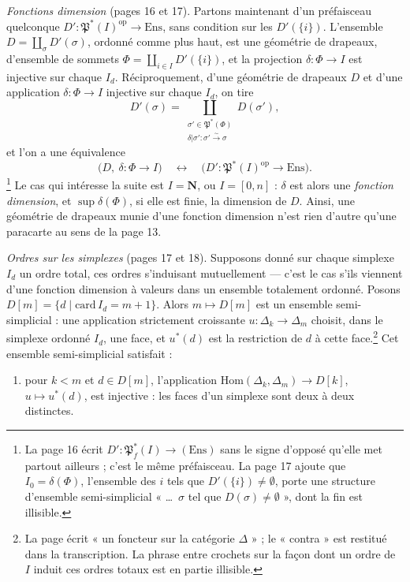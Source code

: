 \documentclass[11pt,a4paper]{article}
\begin{document}
\emph{Fonctions dimension} (pages 16 et 17). Partons maintenant d'un
préfaisceau quelconque $D' : \mathfrak{P}^*(I)^{\mathrm{op}} \to
\mathrm{Ens}$, sans condition sur les $D'(\{i\})$. L'ensemble $D =
\coprod_\sigma D'(\sigma)$, ordonné comme plus haut, est une géométrie de
drapeaux, d'ensemble de sommets $\Phi = \coprod_{i \in I} D'(\{i\})$, et la
projection $\delta : \Phi \to I$ est injective sur chaque $I_d$.
Réciproquement, d'une géométrie de drapeaux $D$ et d'une application
$\delta : \Phi \to I$ injective sur chaque $I_d$, on tire
\[
  D'(\sigma) = \coprod_{\substack{\sigma' \in \mathfrak{P}^*(\Phi) \\
  \delta|\sigma' : \sigma' \xrightarrow{\sim} \sigma}} D(\sigma') ,
\]
et l'on a une équivalence
\[
  \bigl(D, \ \delta : \Phi \to I\bigr) \quad \longleftrightarrow \quad
  \bigl(D' : \mathfrak{P}^*(I)^{\mathrm{op}} \to \mathrm{Ens}\bigr) .
\]
\footnote{La page 16 écrit $D' : \mathfrak{P}_f^*(I) \to (\mathrm{Ens})$ sans le
signe d'opposé qu'elle met partout ailleurs ; c'est le même préfaisceau. La
page 17 ajoute que $I_0 = \delta(\Phi)$, l'ensemble des $i$ tels que
$D'(\{i\}) \neq \emptyset$, porte une structure d'ensemble semi-simplicial
« \ldots\ $\sigma$ tel que $D(\sigma) \neq \emptyset$ », dont la fin est
illisible.} Le cas qui intéresse la suite est $I = \mathbf{N}$, ou $I = [0,
n]$ : $\delta$ est alors une \emph{fonction dimension}, et $\sup \delta(\Phi)$,
si elle est finie, la dimension de $D$. Ainsi, une géométrie de drapeaux munie
d'une fonction dimension n'est rien d'autre qu'une paracarte au sens de la
page 13.

\emph{Ordres sur les simplexes} (pages 17 et 18). Supposons donné sur chaque
simplexe $I_d$ un ordre total, ces ordres s'induisant mutuellement --- c'est
le cas s'ils viennent d'une fonction dimension à valeurs dans un ensemble
totalement ordonné. Posons $D[m] = \{d \mid \mathrm{card}\, I_d = m + 1\}$.
Alors $m \mapsto D[m]$ est un ensemble semi-simplicial : une application
strictement croissante $u : \Delta_k \to \Delta_m$ choisit, dans le simplexe
ordonné $I_d$, une face, et $u^*(d)$ est la restriction de $d$ à cette
face.\footnote{La page écrit « un foncteur sur la catégorie $\Delta$ » ; le
« contra » est restitué dans la transcription. La phrase entre crochets sur la
façon dont un ordre de $I$ induit ces ordres totaux est en partie
illisible.} Cet ensemble semi-simplicial satisfait :

\begin{enumerate}
  \item[(1)] pour $k < m$ et $d \in D[m]$, l'application
  $\mathrm{Hom}(\Delta_k, \Delta_m) \to D[k]$, $u \mapsto u^*(d)$, est
  injective : les faces d'un simplexe sont deux à deux distinctes.
\end{enumerate}
\end{document}
